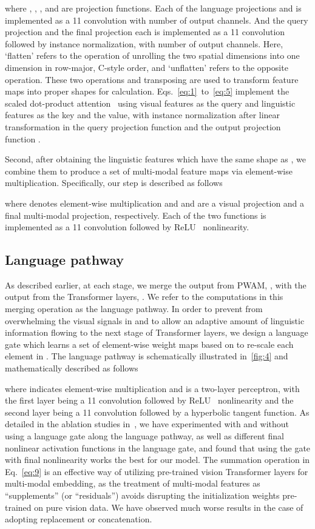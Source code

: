 \documentclass[10pt,twocolumn,letterpaper]{article}
\begin{document}
where , , , and  are projection functions.
Each of the language projections  and  is implemented as a 11 convolution with  number of output channels.
And the query projection  and the final projection  each is implemented as a 11 convolution followed by instance normalization, with  number of output channels.
Here, `flatten' refers to the operation of unrolling the two spatial dimensions into one dimension in row-major, C-style order, and `unflatten' refers to the opposite operation.
These two operations and transposing are used to transform feature maps into proper shapes for calculation.
Eqs.~\ref{eq:1}~to~\ref{eq:5} implement the scaled dot-product attention~\cite{attention-all-you-need} using visual features  as the query and linguistic features  as the key and the value, with instance normalization after linear transformation in the query projection function  and the output projection function .

Second, after obtaining the linguistic features  which have the same shape as , we combine them to produce a set of multi-modal feature maps  via element-wise multiplication.
Specifically, our step is described as follows

where  denotes element-wise multiplication and  and  are a visual projection and a final multi-modal projection, respectively.
Each of the two functions is implemented as a 11 convolution followed by ReLU~\cite{relu} nonlinearity.

\subsection{Language pathway}
\label{sec:lp}
As described earlier, at each stage, we merge the output from PWAM, , with the output from the Transformer layers, .
We refer to the computations in this merging operation as the language pathway.
In order to prevent  from overwhelming the visual signals in  and to allow an adaptive amount of linguistic information flowing to the next stage of Transformer layers, we design a language gate which learns a set of element-wise weight maps based on  to re-scale each element in .
The language pathway is schematically illustrated in~\cref{fig:4} and mathematically described as follows

where  indicates element-wise multiplication and  is a two-layer perceptron, with the first layer being a 11 convolution followed by ReLU~\cite{relu} nonlinearity and the second layer being a 11 convolution followed by a hyperbolic tangent function.
As detailed in the ablation studies in~, we have experimented with and without using a language gate along the language pathway, as well as different final nonlinear activation functions in the language gate, and found that using the gate with  final nonlinearity works the best for our model.
The summation operation in Eq.~\ref{eq:9} is an effective way of utilizing pre-trained vision Transformer layers for multi-modal embedding, as the treatment of multi-modal features as ``supplements'' (or ``residuals'') avoids disrupting the initialization weights pre-trained on pure vision data.
We have observed much worse results in the case of adopting replacement or concatenation.
\end{document}
